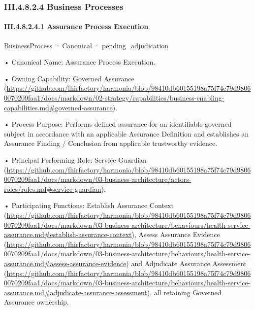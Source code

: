 \subsubsection*{III.4.8.2.4 Business Processes}
\label{navigation:III.4.8.2.4}

\paragraph*{III.4.8.2.4.1 Assurance Process Execution}
\label{navigation:III.4.8.2.4.1}

\label{element:3c67e57403b041bb8ccdaf3980b6ff94}
{\small BusinessProcess · Canonical · pending\_adjudication}\par

•
Canonical Name: Assurance Process Execution.



•
Owning Capability: Governed Assurance (\url{https://github.com/fhirfactory/harmonia/blob/98410db60155198a75f74c79d98060070209faa1/docs/markdown/02-strategy/capabilities/business-enabling-capabilities.md#governed-assurance}).



•
Process Purpose: Performs defined assurance for an identifiable governed subject in accordance with an applicable Assurance Definition and establishes an Assurance Finding / Conclusion from applicable trustworthy evidence.



•
Principal Performing Role: Service Guardian (\url{https://github.com/fhirfactory/harmonia/blob/98410db60155198a75f74c79d98060070209faa1/docs/markdown/03-business-architecture/actors-roles/roles.md#service-guardian}).



•
Participating Functions: Establish Assurance Context (\url{https://github.com/fhirfactory/harmonia/blob/98410db60155198a75f74c79d98060070209faa1/docs/markdown/03-business-architecture/behaviours/health-service-assurance.md#establish-assurance-context}), Assess Assurance Evidence (\url{https://github.com/fhirfactory/harmonia/blob/98410db60155198a75f74c79d98060070209faa1/docs/markdown/03-business-architecture/behaviours/health-service-assurance.md#assess-assurance-evidence}) and Adjudicate Assurance Assessment (\url{https://github.com/fhirfactory/harmonia/blob/98410db60155198a75f74c79d98060070209faa1/docs/markdown/03-business-architecture/behaviours/health-service-assurance.md#adjudicate-assurance-assessment}), all retaining Governed Assurance ownership.



